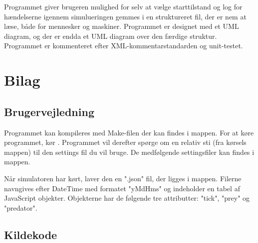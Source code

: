 \documentclass[a4paper]{article}
\begin{document}
    Programmet giver brugeren mulighed for selv at vælge starttilstand og 
    log for hændelserne igennem simulueringen gemmes i en struktureret fil, der er nem at læse, både for mennesker og maskiner.
    Programmet er designet med et UML diagram, og der er endda et UML diagram over den færdige struktur.
    Programmet er kommenteret efter XML-kommentarstandarden og unit-testet.

  \section{Bilag}
      \subsection{Brugervejledning} \label{ssec:manual}
        Programmet kan kompileres med Make-filen der kan findes i  mappen.
        For at køre programmet, kør .
        Programmet vil derefter spørge om en relativ sti (fra kørsels mappen) til den settings fil du vil bruge.
        De medfølgende settingsfiler kan findes i  mappen.

        Når simulatoren har kørt, laver den en ".json" fil, der ligges i  mappen.
        Filerne navngives efter DateTime med formatet "yMdHms" og indeholder en tabel af JavaScript objekter.
        Objekterne har de følgende tre attributter: "tick", "prey" og "predator".

      \subsection{Kildekode} \label{ssec:sourceCode}
        
        
        
\end{document}
